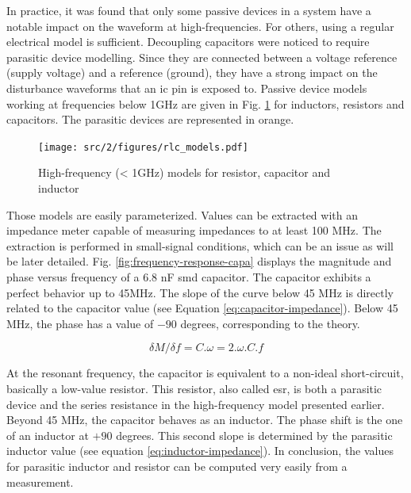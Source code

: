 In practice, it was found that only some passive devices in a system have a notable impact on the waveform at high-frequencies.
For others, using a regular electrical model is sufficient.
Decoupling capacitors were noticed to require parasitic device modelling.
Since they are connected between a voltage reference (supply voltage) and a reference (ground), they have a strong impact on the disturbance waveforms that an \gls{ic} pin is exposed to.
Passive device models working at frequencies below 1GHz are given in Fig. \ref{fig:rlc-esd-models} for inductors, resistors and capacitors.
The parasitic devices are represented in orange.

\begin{figure}[!h]
  \centering
  \texttt{[image: src/2/figures/rlc\_models.pdf]}
  \caption{High-frequency (< 1GHz) models for resistor, capacitor and inductor}
  \label{fig:rlc-esd-models}
\end{figure}

Those models are easily parameterized.
Values can be extracted with an impedance meter capable of measuring impedances to at least 100 MHz.
The extraction is performed in small-signal conditions, which can be an issue as will be later detailed.
Fig. \ref{fig:frequency-response-capa} displays the magnitude and phase versus frequency of a 6.8 nF \gls{smd} capacitor.
The capacitor exhibits a perfect behavior up to 45MHz.
The slope of the curve below 45 MHz is directly related to the capacitor value (see Equation \ref{eq:capacitor-impedance}).
Below 45 MHz, the phase has a value of $-90$ degrees, corresponding to the theory.


\begin{equation}
\delta M/ \delta f = C. \omega = 2.\omega .C.f
\label{eq:capacitor-impedance}
\end{equation}

At the resonant frequency, the capacitor is equivalent to a non-ideal short-circuit, basically a low-value resistor.
This resistor, also called \gls{esr}, is both a parasitic device and the series resistance in the high-frequency model presented earlier.
Beyond 45 MHz, the capacitor behaves as an inductor.
The phase shift is the one of an inductor at $+90$ degrees.
This second slope is determined by the parasitic inductor value (see equation \ref{eq:inductor-impedance}).
In conclusion, the values for parasitic inductor and resistor can be computed very easily from a measurement.


